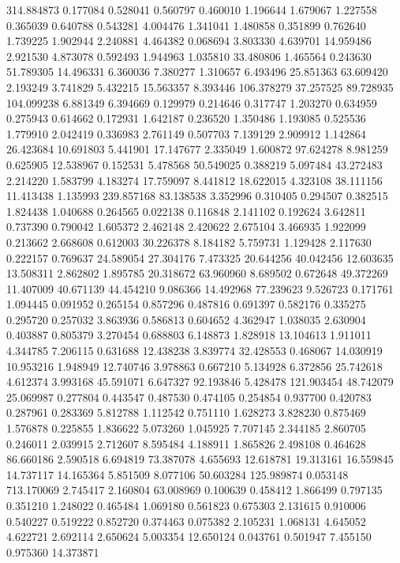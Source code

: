314.884873
0.177084
0.528041
0.560797
0.460010
1.196644
1.679067
1.227558
0.365039
0.640788
0.543281
4.004476
1.341041
1.480858
0.351899
0.762640
1.739225
1.902944
2.240881
4.464382
0.068694
3.803330
4.639701
14.959486
2.921530
4.873078
0.592493
1.944963
1.035810
33.480806
1.465564
0.243630
51.789305
14.496331
6.360036
7.380277
1.310657
6.493496
25.851363
63.609420
2.193249
3.741829
5.432215
15.563357
8.393446
106.378279
37.257525
89.728935
104.099238
6.881349
6.394669
0.129979
0.214646
0.317747
1.203270
0.634959
0.275943
0.614662
0.172931
1.642187
0.236520
1.350486
1.193085
0.525536
1.779910
2.042419
0.336983
2.761149
0.507703
7.139129
2.909912
1.142864
26.423684
10.691803
5.441901
17.147677
2.335049
1.600872
97.624278
8.981259
0.625905
12.538967
0.152531
5.478568
50.549025
0.388219
5.097484
43.272483
2.214220
1.583799
4.183274
17.759097
8.441812
18.622015
4.323108
38.111156
11.413438
1.135993
239.857168
83.138538
3.352996
0.310405
0.294507
0.382515
1.824438
1.040688
0.264565
0.022138
0.116848
2.141102
0.192624
3.642811
0.737390
0.790042
1.605372
2.462148
2.420622
2.675104
3.466935
1.922099
0.213662
2.668608
0.612003
30.226378
8.184182
5.759731
1.129428
2.117630
0.222157
0.769637
24.589054
27.304176
7.473325
20.644256
40.042456
12.603635
13.508311
2.862802
1.895785
20.318672
63.960960
8.689502
0.672648
49.372269
11.407009
40.671139
44.454210
9.086366
14.492968
77.239623
9.526723
0.171761
1.094445
0.091952
0.265154
0.857296
0.487816
0.691397
0.582176
0.335275
0.295720
0.257032
3.863936
0.586813
0.604652
4.362947
1.038035
2.630904
0.403887
0.805379
3.270454
0.688803
6.148873
1.828918
13.104613
1.911011
4.344785
7.206115
0.631688
12.438238
3.839774
32.428553
0.468067
14.030919
10.953216
1.948949
12.740746
3.978863
0.667210
5.134928
6.372856
25.742618
4.612374
3.993168
45.591071
6.647327
92.193846
5.428478
121.903454
48.742079
25.069987
0.277804
0.443547
0.487530
0.474105
0.254854
0.937700
0.420783
0.287961
0.283369
5.812788
1.112542
0.751110
1.628273
3.828230
0.875469
1.576878
0.225855
1.836622
5.073260
1.045925
7.707145
2.344185
2.860705
0.246011
2.039915
2.712607
8.595484
4.188911
1.865826
2.498108
0.464628
86.660186
2.590518
6.694819
73.387078
4.655693
12.618781
19.313161
16.559845
14.737117
14.165364
5.851509
8.077106
50.603284
125.989874
0.053148
713.170069
2.745417
2.160804
63.008969
0.100639
0.458412
1.866499
0.797135
0.351210
1.248022
0.465484
1.069180
0.561823
0.675303
2.131615
0.910006
0.540227
0.519222
0.852720
0.374463
0.075382
2.105231
1.068131
4.645052
4.622721
2.692114
2.650624
5.003354
12.650124
0.043761
0.501947
7.455150
0.975360
14.373871
